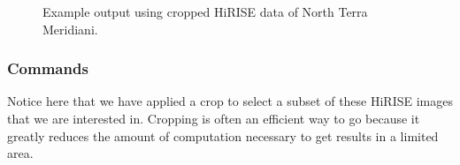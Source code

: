 \begin{figure}[h!]
\centering
  \hfil
\caption{Example output using cropped HiRISE data of North Terra Meridiani.}
\label{fig:hirise_nterra_example}
\end{figure}

\subsubsection*{Commands}

Notice here that we have applied a crop to select a subset of these
HiRISE images that we are interested in.  Cropping is often an
efficient way to go because it greatly reduces the amount of
computation necessary to get results in a limited area.

